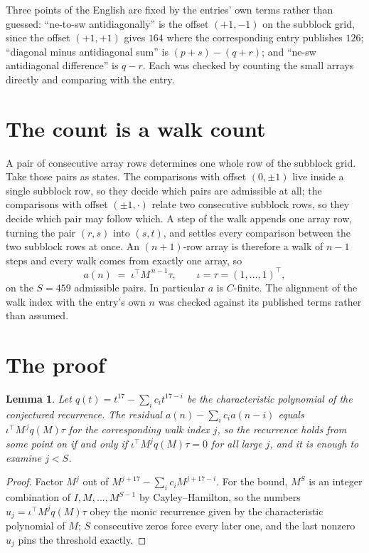 \documentclass[11pt,a4paper]{article}
\theoremstyle{plain}
\newtheorem{lemma}[theorem]{Lemma}
\theoremstyle{definition}
\begin{document}
Three points of the English are fixed by the entries' own terms rather than guessed:
``ne-to-sw antidiagonally'' is the offset $(+1,-1)$ on the subblock grid, since the offset
$(+1,+1)$ gives $164$ where the corresponding entry publishes $126$; ``diagonal minus
antidiagonal sum'' is $(p+s)-(q+r)$; and ``ne-sw antidiagonal difference'' is $q-r$. Each was
checked by counting the small arrays directly and comparing with the entry.

\section{The count is a walk count}

A pair of consecutive array rows determines one whole row of the subblock grid. Take those
pairs as states. The comparisons with offset $(0,\pm1)$ live inside a single subblock row, so
they decide which pairs are admissible at all; the comparisons with offset $(\pm1,\cdot)$
relate two consecutive subblock rows, so they decide which pair may follow which. A step of the
walk appends one array row, turning the pair $(r,s)$ into $(s,t)$, and settles every comparison
between the two subblock rows at once. An $(n+1)$-row array is therefore a walk of $n-1$ steps
and every walk comes from exactly one array, so
\[
a(n)\;=\;\iota^{\!\top}M^{\,n-1}\tau,\qquad \iota=\tau=(1,\dots,1)^{\!\top},
\]
on the $S=459$ admissible pairs. In particular $a$ is $C$-finite. The alignment of the walk
index with the entry's own $n$ was checked against its published terms rather than assumed.

\section{The proof}

\begin{lemma}\label{lem:crit}
Let $q(t)=t^{17}-\sum_i c_it^{17-i}$ be the characteristic polynomial of the
conjectured recurrence. The residual $a(n)-\sum_ic_ia(n-i)$ equals
$\iota^{\!\top}M^{\,j}q(M)\tau$ for the corresponding walk index $j$, so the recurrence
holds from some point on if and only if $\iota^{\!\top}M^{j}q(M)\tau=0$ for all large $j$,
and it is enough to examine $j<S$.
\end{lemma}

\begin{proof}
Factor $M^{j}$ out of $M^{j+17}-\sum_ic_iM^{j+17-i}$. For the bound, $M^{S}$
is an integer combination of $I,M,\dots,M^{S-1}$ by Cayley--Hamilton, so the numbers
$u_j=\iota^{\!\top}M^{j}q(M)\tau$ obey the monic recurrence given by the characteristic
polynomial of $M$; $S$ consecutive zeros force every later one, and the last nonzero $u_j$
pins the threshold exactly.
\end{proof}
\end{document}
